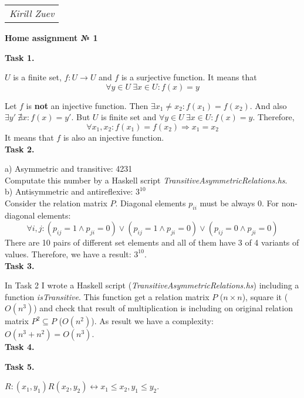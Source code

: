 \documentclass{article}
\begin{document}
\null\hfill\begin{tabular}[t]{l@{}}
	\textit{Kirill Zuev}
\end{tabular}

\begin{center}
	\textbf{Home assignment № 1}
\end{center}

\textbf{Task 1.}

$U$ is a finite set, $f: U \to U$ and $f$ is a surjective function. It means that
$$\forall y \in U~\exists x \in U: f(x) = y$$

Let $f$ is \textbf{not} an injective function. Then $\exists x_1 \neq x_2: f(x_1) = f(x_2)$. And also $\exists y'~\nexists x: f(x) = y'$. But $U$ is finite set and $\forall y \in U~\exists x \in U: f(x) = y$. Therefore,
$$\forall x_1, x_2: f(x_1) = f(x_2) \Rightarrow x_1 = x_2 $$
It means that $f$ is also an injective function.\\

\textbf{Task 2.}

a) Asymmetric and transitive: 4231\\
Computate this number by a Haskell script \textit{TransitiveAsymmetricRelations.hs}.\\

b) Antisymmetric and antireflexive: $3^{10}$\\
Consider the relation matrix $P$. Diagonal elements $p_{ii}$ must be always 0. For non-diagonal elements:
$$\forall i, j: (p_{ij} = 1 \land p_{ji} = 0) \lor (p_{ij} = 1 \land p_{ji} = 0) \lor (p_{ij} = 0 \land p_{ji} = 0) $$
There are 10 pairs of different set elements and all of them have 3 of 4 variants of values. Therefore, we have a result: $3^{10}$.\\

\textbf{Task 3.}

In Task 2 I wrote a Haskell script (\textit{TransitiveAsymmetricRelations.hs}) including a function \textit{isTransitive}. This function get a relation matrix $P$ ($n \times n$), square it ($O(n^3)$) and check that result of multiplication is including on original relation matrix $P^2 \subseteq P$ ($O(n^2)$). As result we have a complexity: $O(n^3 + n^2) = O(n^3)$.\\

\textbf{Task 4.}



\textbf{Task 5.}

$R: (x_1, y_1) R (x_2, y_2) \leftrightarrow x_1 \leq x_2, y_1 \leq y_2$.\\
\end{document}
